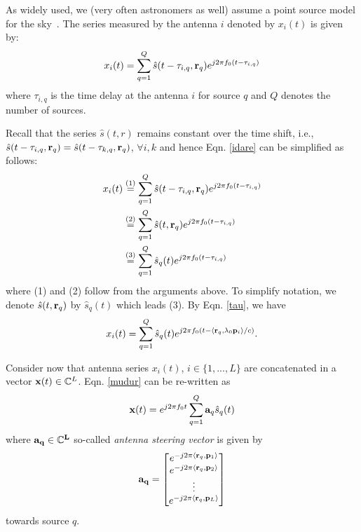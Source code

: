 \documentclass[aoas,preprint]{imsart}
\numberwithin{equation}{section}
\theoremstyle{plain}
\begin{document}
{As widely used, we (very often astronomers as well) assume a point source model for the sky~\cite{veen2013ra, perley1999ra}. The series measured by the antenna $i$ denoted by $x_i(t)$ is given by:
 \begin{equation}\label{idare}
 x_i(t) = \sum_{q=1}^Q \hat{s}(t-\tau_{i,q},{\bf r}_q)e^{j2\pi f_0 (t-\tau_{i,q})}
 \end{equation} 
 where $\tau_{i,q}$ is the time delay at the antenna $i$ for source $q$ and $Q$ denotes the number of sources. 
 \vspace{0.5em}
 
Recall that the series $\hat{s}(t,r)$ remains constant over the time shift, i.e., $\hat{s}(t-\tau_{i,q},{\bf r}_q) = \hat{s}(t-\tau_{k,q},{\bf r}_q)$, $\forall i,k$ and hence Eqn. \ref{idare} can be simplified as follows:
\begin{equation}
\begin{split}
x_i(t) &\stackrel{(1)}{=} \sum_{q=1}^Q \hat{s}(t-\tau_{i,q},{\bf r}_q)e^{j2\pi f_0 (t-\tau_{i,q})}\\
&\stackrel{(2)}{=} \sum_{q=1}^Q \hat{s}(t, {\bf r}_q)e^{j2\pi f_0 (t-\tau_{i,q})}\\
&\stackrel{(3)}{=} \sum_{q=1}^Q \hat{s}_q(t)e^{j2\pi f_0 (t-\tau_{i,q})}
\end{split}
\end{equation}
where (1) and (2) follow from the arguments above. To simplify notation, we denote $\hat{s}(t,{\bf r}_q)$ by $\hat{s}_q(t)$ which leads (3).
By Eqn. \ref{tau}, we have
\begin{equation}\label{mudur}
x_i(t) = \sum_{q=1}^Q \hat{s}_q(t)e^{j2\pi f_0 (t- \langle {\bf r}_q,\lambda_0{\bf p}_i\rangle/c)}.
\end{equation}
 
Consider now that antenna series $x_i(t)$, $i\in \{ 1,...,L\}$ are concatenated in a vector ${\bf x}(t) \in \mathbb{C}^L$. Eqn. \ref{mudur} can be re-written as
 \begin{equation}
{\bf x}(t) = e^{j2\pi f_0 t} \sum_{q=1}^Q {\bf a}_q \hat{s}_q(t)\label{ind_xt}
\end{equation}
where $\bf{a}_q \in \mathbb{C}^L$ so-called {\it antenna steering vector} is given by
\begin{equation}\label{steering}
\bf{a}_q =
  \begin{bmatrix}
    e^{-j2\pi \langle {\bf r}_q, {\bf p}_1 \rangle}   \\
    e^{-j2\pi \langle {\bf r}_q, {\bf p}_2 \rangle}    \\
    \vdots \\
    e^{-j2\pi \langle {\bf r}_q, {\bf p}_L \rangle}   
  \end{bmatrix}
 \end{equation}
 towards source $q$.
 
}
\end{document}
